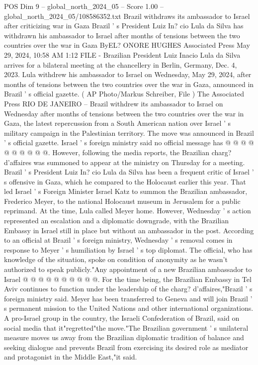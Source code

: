 \begin{textsample}{POS Dim 9 – global\_north\_2024\_05 – Score 1.00 – global\_north\_2024\_05/108586352.txt}  \label{ex:f9_pos_294}
Brazil withdraws its ambassador to Israel after criticizing war in Gaza Brazil ' s President Luiz In? cio Lula da Silva has withdrawn his ambassador to Israel after months of tensions between the two countries over the war in Gaza ByEL?
ONORE HUGHES Associated Press May 29, 2024, 10:58 AM 1:12 FILE - Brazilian President Luiz Inacio Lula da Silva arrives for a bilateral meeting at the chancellery in Berlin, Germany, Dec. 4, 2023.
Lula withdrew his ambassador to Israel on Wednesday, May 29, 2024, after months of tensions between the two countries over the war in Gaza, announced in Brazil ' s official gazette. ( AP Photo/Markus Schreiber, File ) The Associated Press RIO DE JANEIRO -- Brazil withdrew its ambassador to Israel on Wednesday after months of tensions between the two countries over the war in Gaza, the latest repercussion from a South American nation over Israel ' s military campaign in the Palestinian territory.
The move was announced in Brazil ' s official gazette.
Israel ' s foreign ministry said no official message has @ @ @ @ @ @ @ @ @ @.
However, following the media reports, the Brazilian charg? d'affaires was summoned to appear at the ministry on Thursday for a meeting.
Brazil ' s President Luiz In? cio Lula da Silva has been a frequent critic of Israel ' s offensive in Gaza, which he compared to the Holocaust earlier this year.
That led Israel ' s Foreign Minister Israel Katz to summon the Brazilian ambassador, Frederico Meyer, to the national Holocaust museum in Jerusalem for a public reprimand.
At the time, Lula called Meyer home.
However, Wednesday ' s action represented an escalation and a diplomatic downgrade, with the Brazilian Embassy in Israel still in place but without an ambassador in the post.
According to an official at Brazil ' s foreign ministry, Wednesday ' s removal comes in response to Meyer ' s humiliation by Israel ' s top diplomat.
The official, who has knowledge of the situation, spoke on condition of anonymity as he wasn't authorized to speak publicly."Any appointment of a new Brazilian ambassador to Israel @ @ @ @ @ @ @ @ @ @.
For the time being, the Brazilian Embassy in Tel Aviv continues to function under the leadership of the charg? d'affaires,"Brazil ' s foreign ministry said.
Meyer has been transferred to Geneva and will join Brazil ' s permanent mission to the United Nations and other international organizations.
A pro-Israel group in the country, the Israeli Confederation of Brazil, said on social media that it"regretted"the move."The Brazilian government ' s unilateral measure moves us away from the Brazilian diplomatic tradition of balance and seeking dialogue and prevents Brazil from exercising its desired role as mediator and protagonist in the Middle East,"it said.

\end{textsample}
